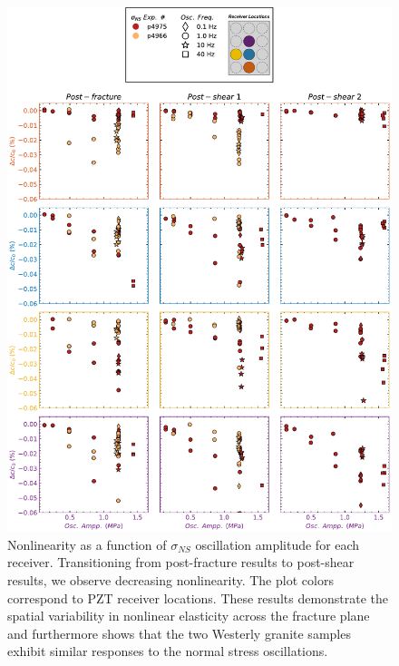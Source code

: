 \documentclass[letterpaper,10pt]{article}
\begin{document}
\begin{figure}[ht]
	\centering
	\includegraphics[width=0.9\columnwidth]{Delc_bypair_all_NS}
	\caption{Nonlinearity as a function of $ \sigma_{NS} $ oscillation amplitude for each receiver. Transitioning from post-fracture results to post-shear results, we observe decreasing nonlinearity. The plot colors correspond to PZT receiver locations. These results demonstrate the spatial variability in nonlinear elasticity across the fracture plane and furthermore shows that the two Westerly granite samples exhibit similar responses to the normal stress oscillations.  }
	\label{fig:delc_plots_ns}
\end{figure}

\clearpage
\end{document}
